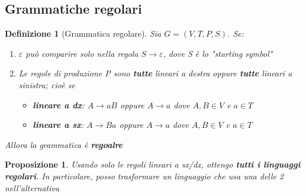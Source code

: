 \documentclass[12pt]{article}
\newtheorem{Definizione}{Definizione}[subsection]
\newtheorem{Proposizione}{Proposizione}[subsection]
\begin{document}
\subsection{Grammatiche regolari}
\begin{Definizione}[Grammatica regolare]
Sia $G = (V, T, P, S)$. Se:
\begin{enumerate}
    \item $\varepsilon$ può comparire solo nella regola $S \to \varepsilon$, dove S è lo "starting symbol"
    \item Le regole di produzione P sono \textbf{tutte} lineari a destra oppure \textbf{tutte} lineari a sinistra; cioè se
    \begin{itemize}
        \item \textbf{lineare a dx}: $A \to aB$ oppure $A \to a$ dove $A,B \in V$ e $a \in T$
        \item \textbf{lineare a sx}: $A \to Ba$ oppure $A \to a$ dove $A,B \in V$ e $a \in T$
    \end{itemize}
\end{enumerate}
Allora la grammatica è \textbf{regoalre}
\end{Definizione}
\begin{Proposizione}
    Usando solo le regoli lineari a sx/dx, ottengo \textbf{tutti i linguaggi regolari}. In particolare, posso trasformare un linguaggio che usa una delle 2 nell'alternativa
\end{Proposizione}
\end{document}
